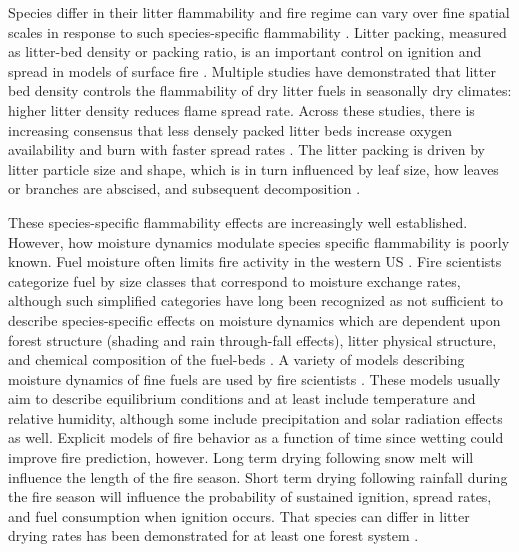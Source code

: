 \documentclass[letterpaper,12pt]{article}
\begin{document}
Species differ in their litter flammability \citep{Fonda+Belanger+etal-1998,
  Fonda-2001, Scarff+Westoby-2006, Kane+Varner+etal-2008,
  Cornwell+Elvira+etal-2015} and fire regime can vary over fine spatial scales
in response to such species-specific flammability \citep{Stephens-2001,
  Hille+Stephens-2005, Schwilk+Caprio-2011}. Litter packing, measured as
litter-bed density or packing ratio, is an important control on ignition and
spread in models of surface fire \citep{Weber-1991, Balbi+Santoni+etal-1999,
  Morvan+Larini-2001}. Multiple studies have demonstrated that litter bed
density controls the flammability of dry litter fuels in seasonally dry
climates: higher litter density reduces flame spread rate. Across these
studies, there is increasing consensus that less densely packed litter beds
increase oxygen availability and burn with faster spread rates
\citep{Scarff+Westoby-2006, Schwilk+Caprio-2011, Magalhaes+Schwilk-2012,
  Cornwell+Elvira+etal-2015, Varner+Kane+etal-2015, Kreye+Varner+etal-2018}.
The litter packing is driven by litter particle size and shape, which is in
turn influenced by leaf size, how leaves or branches are abscised, and
subsequent decomposition \citep{Fonda+Belanger+etal-1998,
  Stephens+Finney+etal-2004, Scarff+Westoby-2006, Kane+Varner+etal-2008,
  Cornwell+Elvira+etal-2015, Zhao+Cornwell+etal-2016,
  Grootemaat+Wright+etal-2017, Prior+Murphy+etal-2018,
  Zhao+vanLogtestijn+etal-2019}.

These species-specific flammability effects are increasingly well established.
However, how moisture dynamics modulate species specific flammability is poorly
known. Fuel moisture often limits fire activity in the western US
\citep{Miller+Urban-1999, Parks+Parisien-2014}. Fire scientists categorize fuel
by size classes that correspond to moisture exchange rates, although such
simplified categories have long been recognized as not sufficient to describe
species-specific effects on moisture dynamics \citep{Anderson-1985} which are
dependent upon forest structure (shading and rain through-fall effects), litter
physical structure, and chemical composition of the fuel-beds
\citep{Nelson+Hiers-2008, Matthews-2014, Kreye_Hiers_etal-2018}. A variety of
models describing moisture dynamics of fine fuels are used by fire scientists
\citep{Viney-1991, Nelson-2000, Catchpole+Catchpole+etal-2001}. These models
usually aim to describe equilibrium conditions and at least include temperature
and relative humidity, although some include precipitation and solar radiation
effects as well. Explicit models of fire behavior as a function of time since
wetting could improve fire prediction, however. Long term drying following snow
melt will influence the length of the fire season. Short term drying following
rainfall during the fire season will influence the probability of sustained
ignition, spread rates, and fuel consumption when ignition occurs. That species
can differ in litter drying rates has been demonstrated for at least one forest
system \citep{Kreye+Varner+etal-2013}.
\end{document}
